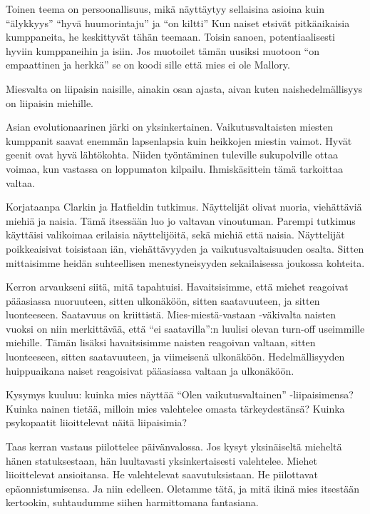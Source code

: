Toinen teema on persoonallisuus, mikä näyttäytyy sellaisina asioina kuin ``älykkyys\vmq{,}'' ``hyvä huumorintaju\vmq{,}'' ja ``on kiltti'' Kun naiset etsivät pitkäaikaisia kumppaneita, he keskittyvät tähän teemaan. Toisin sanoen, potentiaalisesti hyviin kumppaneihin ja isiin. Jos muotoilet tämän uusiksi muotoon ``on empaattinen ja herkkä\vmq{,}'' se on koodi sille että mies ei ole Mallory.

Miesvalta on liipaisin naisille, ainakin osan ajasta, aivan kuten naishedelmällisyys on liipaisin miehille.

Asian evolutionaarinen järki on yksinkertainen. Vaikutusvaltaisten miesten kumppanit saavat enemmän lapsenlapsia kuin heikkojen miestin vaimot. Hyvät geenit ovat hyvä lähtökohta. Niiden työntäminen tuleville sukupolville ottaa voimaa, kun vastassa on loppumaton kilpailu. Ihmiskäsittein tämä tarkoittaa valtaa.

Korjataanpa Clarkin ja Hatfieldin tutkimus. Näyttelijät olivat nuoria, viehättäviä miehiä ja naisia. Tämä itsessään luo jo valtavan vinoutuman. Parempi tutkimus käyttäisi valikoimaa erilaisia näyttelijöitä, sekä miehiä että naisia. Näyttelijät poikkeaisivat toisistaan iän, viehättävyyden ja vaikutusvaltaisuuden osalta. Sitten mittaisimme heidän suhteellisen menestyneisyyden sekailaisessa joukossa kohteita.

Kerron arvaukseni siitä, mitä tapahtuisi. Havaitsisimme, että miehet reagoivat pääasiassa nuoruuteen, sitten ulkonäköön, sitten saatavuuteen, ja sitten luonteeseen. Saatavuus on kriittistä. Mies-miestä-vastaan -väkivalta naisten vuoksi on niin merkittävää, että ``ei saatavilla'':n luulisi olevan turn-off useimmille miehille. Tämän lisäksi havaitsisimme naisten reagoivan valtaan, sitten luonteeseen, sitten saatavuuteen, ja viimeisenä ulkonäköön. Hedelmällisyyden huippuaikana naiset reagoisivat pääasiassa valtaan ja ulkonäköön.

Kysymys kuuluu: kuinka mies näyttää ``Olen vaikutusvaltainen'' -liipaisimensa? Kuinka nainen tietää, milloin mies valehtelee omasta tärkeydestänsä? Kuinka psykopaatit liioittelevat näitä liipaisimia?


Taas kerran vastaus piilottelee päivänvalossa. Jos kysyt yksinäiseltä mieheltä hänen statuksestaan, hän luultavasti yksinkertaisesti valehtelee. Miehet liioittelevat ansioitansa. He valehtelevat saavutuksistaan. He piilottavat epäonnistumisensa. Ja niin edelleen. Oletamme tätä, ja mitä ikinä mies itsestään kertookin, suhtaudumme siihen harmittomana fantasiana. 

